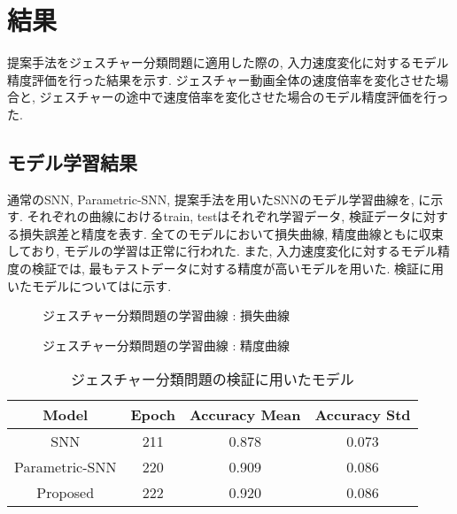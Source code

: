 \section{結果} \label{sec:result2}
提案手法をジェスチャー分類問題に適用した際の, 入力速度変化に対するモデル精度評価を行った結果を示す.
ジェスチャー動画全体の速度倍率を変化させた場合と, ジェスチャーの途中で速度倍率を変化させた場合のモデル精度評価を行った.

\subsection{モデル学習結果}
通常のSNN, Parametric-SNN, 提案手法を用いたSNNのモデル学習曲線を, に示す.
それぞれの曲線におけるtrain, testはそれぞれ学習データ, 検証データに対する損失誤差と精度を表す.
全てのモデルにおいて損失曲線, 精度曲線ともに収束しており, モデルの学習は正常に行われた.
また, 入力速度変化に対するモデル精度の検証では, 最もテストデータに対する精度が高いモデルを用いた.
検証に用いたモデルについてはに示す.
\begin{figure}[htb]
    \centering
    
    \caption{ジェスチャー分類問題の学習曲線 : 損失曲線}
    \label{fig:result2:losscurve}
\end{figure}
\begin{figure}[htb]
    \centering
    
    \caption{ジェスチャー分類問題の学習曲線 : 精度曲線}
    \label{fig:result2:acccurve}
\end{figure}

\begin{table}[htb]
    \centering
    \caption{ジェスチャー分類問題の検証に用いたモデル}
    \label{tab:result2:model:parameter}
    \begin{tabular}{cccc}
        \hline
        \textbf{Model}& \textbf{Epoch} & \textbf{Accuracy Mean} & \textbf{Accuracy Std}\\
        \hline
        SNN &  211 & 0.878 & 0.073\\
        Parametric-SNN & 220 & 0.909 & 0.086\\
        Proposed & 222 & 0.920 & 0.086\\
        \hline
    \end{tabular}
\end{table}
\clearpage

